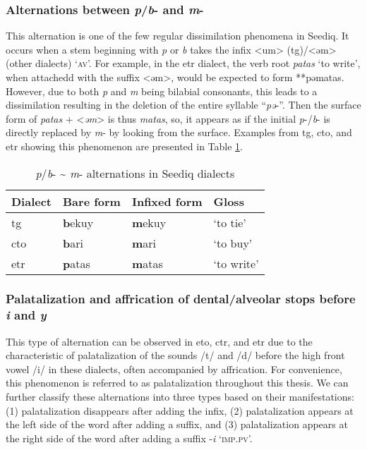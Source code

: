 \subsubsection{Alternations between \textit{p}/\textit{b}- and \textit{m}-}

This alternation is one of the few regular dissimilation phenomena in Seediq. It occurs when a stem beginning with \textit{p} or \textit{b} takes the infix <um> (\acs{tg})/<əm> (other dialects) `\textsc{av}'. For example, in the \acl{etr} dialect, the verb root \textit{patas} `to write', when attachedd with the suffix <əm>, would be expected to form **pəmatas. However, due to both \textit{p} and \textit{m} being bilabial consonants, this leads to a dissimilation resulting in the deletion of the entire syllable ``\textit{pə}-''. Then the surface form of \textit{patas} + <\textit{əm}> is thus \textit{matas}, so, it appears as if the initial \textit{p}-/\textit{b}- is directly replaced by \textit{m}- by looking from the surface. Examples from \acl{tg}, \acl{cto}, and \acl{etr} showing this phenomenon are presented in Table \ref{tab:bpm_alt}.

\begin{table}[!htbp]
\centering
\caption{\textit{p}/\textit{b}- \~{} \textit{m}- alternations in Seediq dialects}
\label{tab:bpm_alt}
\begin{tabular}{llll}
\hline
Dialect   & Bare form & Infixed form & Gloss      \\ \hline
\acl{tg}  & \textbf{b}ekuy     & \textbf{m}ekuy        & `to tie'   \\ 
\acl{cto} & \textbf{b}ari      & \textbf{m}ari         & `to buy'   \\
\acl{etr} & \textbf{p}atas     & \textbf{m}atas        & `to write' \\ \hline
\end{tabular}
\end{table}


\subsubsection{Palatalization and affrication of dental/alveolar stops before \textit{i} and \textit{y}}

This type of alternation can be observed in \acl{eto}, \acl{ctr}, and \acl{etr} due to the characteristic of palatalization of the sounds /t/ and /d/ before the high front vowel /i/ in these dialects, often accompanied by affrication. For convenience, this phenomenon is referred to as palatalization throughout this thesis. We can further classify these alternations into three types based on their manifestations: (1) palatalization disappears after adding the infix, (2) palatalization appears at the left side of the word after adding a suffix, and (3) palatalization appears at the right side of the word after adding a suffix -\textit{i} `\textsc{imp.pv}'.

